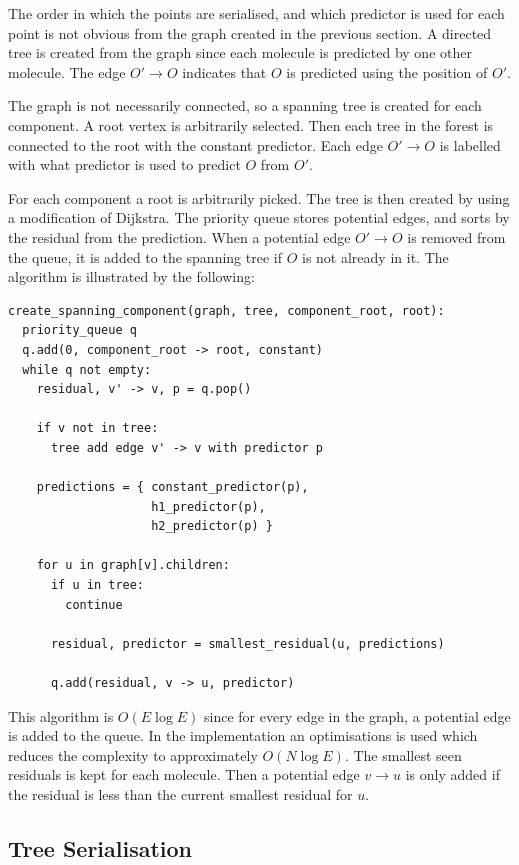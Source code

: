 \documentclass[a4paper]{report}
\begin{document}
The order in which the points are serialised, and which predictor is used for
each point is not obvious from the graph created in the previous section. A
directed tree is created from the graph since each molecule is predicted by
one other molecule. The edge $O' \to O$ indicates that $O$ is predicted using
the position of $O'$.

The graph is not necessarily connected, so a spanning tree is created for each
component. A root vertex is arbitrarily selected. Then each tree in the forest
is connected to the root with the constant predictor. Each edge $O' \to O$ is
labelled with what predictor is used to predict $O$ from $O'$.

For each component a root is arbitrarily picked. The tree is then created by
using a modification of Dijkstra. The priority queue stores potential edges,
and sorts by the residual from the prediction. When a potential edge $O' \to
O$ is removed from the queue, it is added to the spanning tree if $O$ is not
already in it. The algorithm is illustrated by the following:

\begin{verbatim}
create_spanning_component(graph, tree, component_root, root):
  priority_queue q
  q.add(0, component_root -> root, constant)
  while q not empty:
    residual, v' -> v, p = q.pop()

    if v not in tree:
      tree add edge v' -> v with predictor p

    predictions = { constant_predictor(p),
                    h1_predictor(p),
                    h2_predictor(p) }

    for u in graph[v].children:
      if u in tree:
        continue

      residual, predictor = smallest_residual(u, predictions)

      q.add(residual, v -> u, predictor)
\end{verbatim}

This algorithm is $O(E \log E)$ since for every edge in the graph, a potential
edge is added to the queue. In the implementation an optimisations is used
which reduces the complexity to approximately $O(N \log E)$. The smallest seen
residuals is kept for each molecule. Then a potential edge $v \to u$ is only
added if the residual is less than the current smallest residual for $u$.


\subsection{Tree Serialisation}
\end{document}
